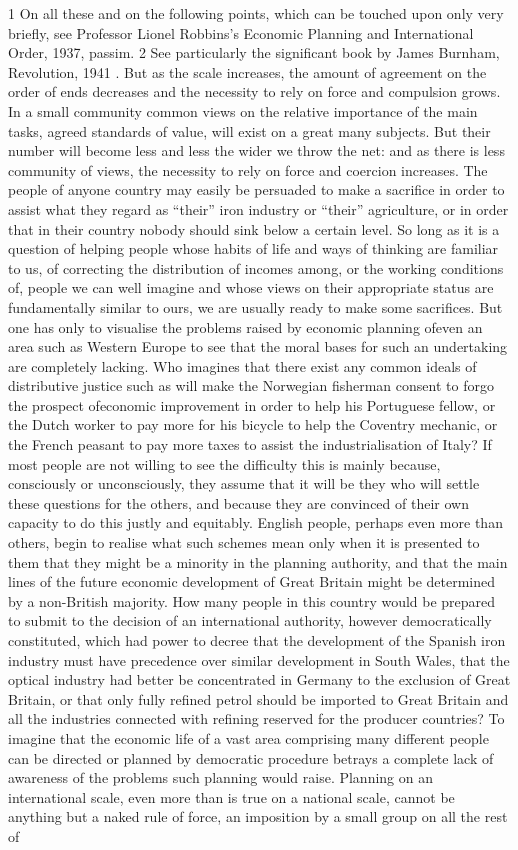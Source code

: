\documentclass[11pt,openany]{book}
\begin{document}
1 On all these and on the following points, which can be touched upon only very briefly, see Professor Lionel Robbins's Economic Planning and International Order, 1937, passim. 2 See particularly the significant book by James Burnham, Revolution, 1941 . But as the scale increases, the amount of agreement on the order of ends decreases and the necessity to rely on force and compulsion grows. In a small community common views on the relative importance of the main tasks, agreed standards of value, will exist on a great many subjects. But their number will become less and less the wider we throw the net: and as there is less community of views, the necessity to rely on force and coercion increases. The people of anyone country may easily be persuaded to make a sacrifice in order to assist what they regard as ``their'' iron industry or ``their'' agriculture, or in order that in their country nobody should sink below a certain level. So long as it is a question of helping people whose habits of life and ways of thinking are familiar to us, of correcting the distribution of incomes among, or the working conditions of, people we can well imagine and whose views on their appropriate status are fundamentally similar to ours, we are usually ready to make some sacrifices. But one has only to visualise the problems raised by economic planning ofeven an area such as Western Europe to see that the moral bases for such an undertaking are completely lacking. Who imagines that there exist any common ideals of distributive justice such as will make the Norwegian fisherman consent to forgo the prospect ofeconomic improvement in order to help his Portuguese fellow, or the Dutch worker to pay more for his bicycle to help the Coventry mechanic, or the French peasant to pay more taxes to assist the industrialisation of Italy? If most people are not willing to see the difficulty this is mainly because, consciously or unconsciously, they assume that it will be they who will settle these questions for the others, and because they are convinced of their own capacity to do this justly and equitably. English people, perhaps even more than others, begin to realise what such schemes mean only when it is presented to them that they might be a minority in the planning authority, and that the main lines of the future economic development of Great Britain might be determined by a non-British majority. How many people in this country would be prepared to submit to the decision of an international authority, however democratically constituted, which had power to decree that the development of the Spanish iron industry must have precedence over similar development in South Wales, that the optical industry had better be concentrated in Germany to the exclusion of Great Britain, or that only fully refined petrol should be imported to Great Britain and all the industries connected with refining reserved for the producer countries? To imagine that the economic life of a vast area comprising many different people can be directed or planned by democratic procedure betrays a complete lack of awareness of the problems such planning would raise. Planning on an international scale, even more than is true on a national scale, cannot be anything but a naked rule of force, an imposition by a small group on all the rest of 
\end{document}
